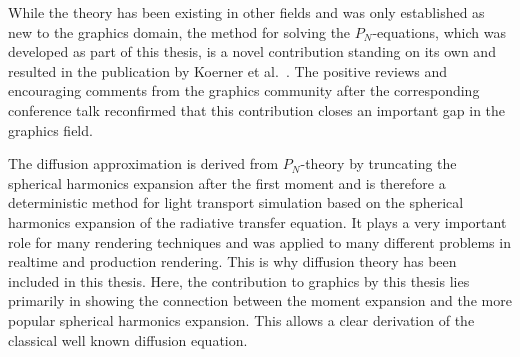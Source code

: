 While the theory has been existing in other fields and was only established as new to the graphics domain, the method for solving the $P_N$-equations, which was developed as part of this thesis, is a novel contribution standing on its own and resulted in the publication by Koerner et al.~\cite{Koerner18}. The positive reviews and encouraging comments from the graphics community after the corresponding conference talk reconfirmed that this contribution closes an important gap in the graphics field.

The diffusion approximation is derived from $P_N$-theory by truncating the spherical harmonics expansion after the first moment and is therefore a deterministic method for light transport simulation based on the spherical harmonics expansion of the radiative transfer equation. It plays a very important role for many rendering techniques and was applied to many different problems in realtime and production rendering. This is why diffusion theory has been included in this thesis. Here, the contribution to graphics by this thesis lies primarily in showing the connection between the moment expansion and the more popular spherical harmonics expansion. This allows a clear derivation of the classical well known diffusion equation.

